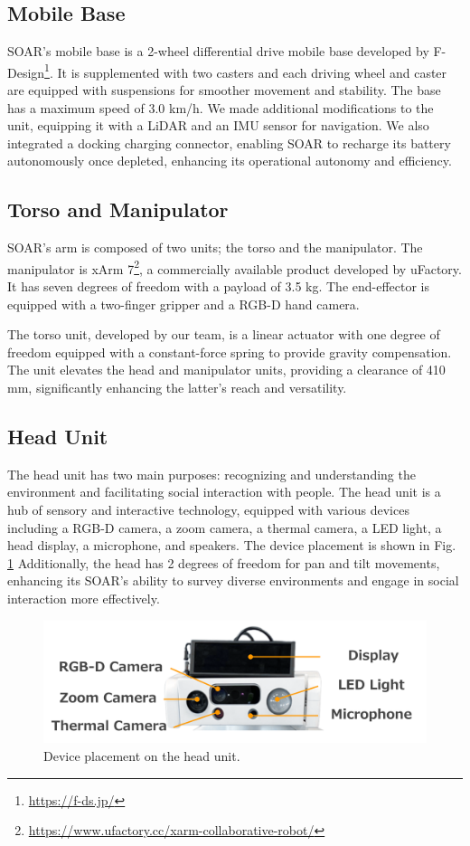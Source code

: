 \documentclass[runningheads,a4paper]{llncs}
\begin{document}
\subsection{Mobile Base}
SOAR’s mobile base is a 2-wheel differential drive mobile base developed by F-Design\footnote{\url{https://f-ds.jp/}}.
It is supplemented with two casters and each driving wheel and caster are equipped with suspensions for smoother movement and stability.
The base has a maximum speed of 3.0 km/h.
We made additional modifications to the unit, equipping it with a LiDAR and an IMU sensor for navigation.
We also integrated a docking charging connector, enabling SOAR to recharge its battery autonomously once depleted, enhancing its operational autonomy and efficiency.

\subsection{Torso and Manipulator}
SOAR’s arm is composed of two units; the torso and the manipulator.
The manipulator is xArm 7\footnote{\url{https://www.ufactory.cc/xarm-collaborative-robot/}}, a commercially available product developed by uFactory.
It has seven degrees of freedom with a payload of 3.5 kg.
The end-effector is equipped with a two-finger gripper and a RGB-D hand camera.

The torso unit, developed by our team, is a linear actuator with one degree of freedom equipped with a constant-force spring to provide gravity compensation.
The unit elevates the head and manipulator units, providing a clearance of 410 mm, significantly enhancing the latter's reach and versatility.

\subsection{Head Unit}
The head unit has two main purposes: recognizing and understanding the environment and facilitating social interaction with people.
The head unit is a hub of sensory and interactive technology, equipped with various devices including a RGB-D camera, a zoom camera, a thermal camera, a LED light, a head display, a microphone, and speakers.
The device placement is shown in Fig. \ref{fig:head}
Additionally, the head has 2 degrees of freedom for pan and tilt movements, enhancing its SOAR’s ability to survey diverse environments and engage in social interaction more effectively.

\begin{figure}[tbp]
	\centering
	\includegraphics[width=1.0\linewidth]{images/head_unit.png}
	\caption{Device placement on the head unit.}
	\label{fig:head}
\end{figure}
\end{document}
